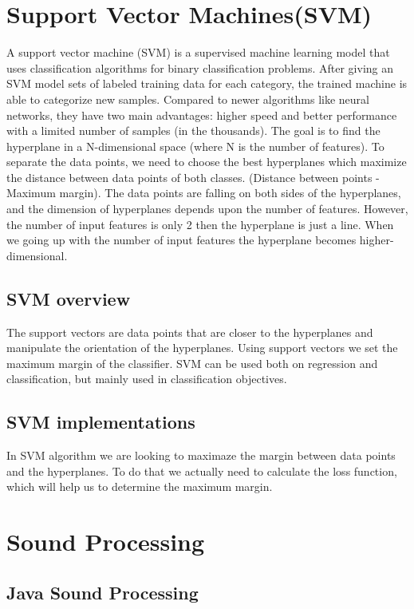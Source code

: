 \documentclass[english,12pt,oneside,a4paper]{article}
\begin{document}
\begin{center}
		\section{Support Vector Machines(SVM)}
		A support vector machine (SVM) is a supervised machine learning model that uses classification algorithms for binary classification problems. After giving an SVM model sets of labeled training data for each category, the trained machine is able to categorize new samples. Compared to newer algorithms like neural networks, they have two main advantages: higher speed and better performance with a limited number of samples (in the thousands).
		The goal is to find the hyperplane in a N-dimensional space (where N is the number of features). To separate the data points, we need to choose the best hyperplanes which maximize the distance between data points of both classes. (Distance between points - Maximum margin). The data points are falling on both sides of the hyperplanes, and the dimension of hyperplanes depends upon the number of features. However, the number of input features is only 2 then the hyperplane is just a line. When we going up with the number of input features the hyperplane becomes higher-dimensional.
		\subsection{SVM overview}
		The support vectors are data points that are closer to the hyperplanes and manipulate the orientation of the hyperplanes. Using support vectors we set the maximum margin of the classifier.
		SVM can be used both on regression and classification, but mainly used in classification objectives.
		\subsection{SVM implementations}
		In SVM algorithm we are looking to maximaze the margin between data points and the hyperplanes. To do that we actually need to calculate the loss function, which will help us to determine the maximum margin.
		\section{Sound Processing}
		
		\subsection{Java Sound Processing}
		

\end{center}
\end{document}

